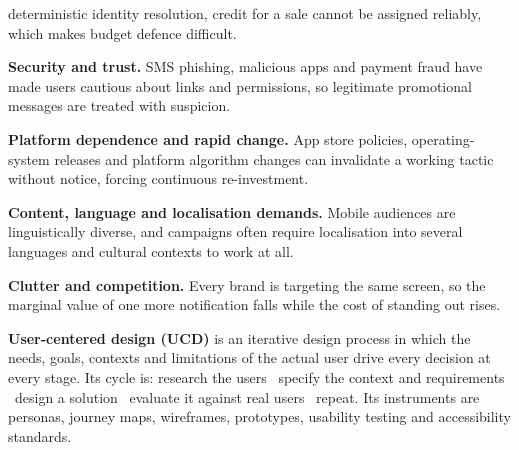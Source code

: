 \begin{qlist}
\begin{apts}
      deterministic identity resolution, credit for a sale cannot be assigned
      reliably, which makes budget defence difficult.
\item \textbf{Security and trust.} SMS phishing, malicious apps and payment
      fraud have made users cautious about links and permissions, so legitimate
      promotional messages are treated with suspicion.
\item \textbf{Platform dependence and rapid change.} App store policies,
      operating-system releases and platform algorithm changes can invalidate a
      working tactic without notice, forcing continuous re-investment.
\item \textbf{Content, language and localisation demands.} Mobile audiences are
      linguistically diverse, and campaigns often require localisation into
      several languages and cultural contexts to work at all.
\item \textbf{Clutter and competition.} Every brand is targeting the same
      screen, so the marginal value of one more notification falls while the
      cost of standing out rises.
\end{apts}

\textbf{User-centered design (UCD)} is an iterative design process in which the
needs, goals, contexts and limitations of the actual user drive every decision
at every stage. Its cycle is: research the users \ra\ specify the context and
requirements \ra\ design a solution \ra\ evaluate it against real users \ra\
repeat. Its instruments are personas, journey maps, wireframes, prototypes,
usability testing and accessibility standards.


\end{qlist}
